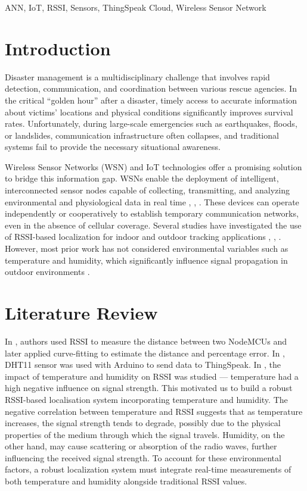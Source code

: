 \documentclass[conference]{IEEEtran}
\begin{document}
\begin{IEEEkeywords}
ANN, IoT, RSSI, Sensors, ThingSpeak Cloud, Wireless Sensor Network
\end{IEEEkeywords}
\section{Introduction}
Disaster management is a multidisciplinary challenge that involves rapid detection, communication, and coordination between various rescue agencies. In the critical “golden hour” after a disaster, timely access to accurate information about victims’ locations and physical conditions significantly improves survival rates. Unfortunately, during large-scale emergencies such as earthquakes, floods, or landslides, communication infrastructure often collapses, and traditional systems fail to provide the necessary situational awareness.

Wireless Sensor Networks (WSN) and IoT technologies offer a promising solution to bridge this information gap. WSNs enable the deployment of intelligent, interconnected sensor nodes capable of collecting, transmitting, and analyzing environmental and physiological data in real time \cite{b1}, \cite{b3}, \cite{b4}. These devices can operate independently or cooperatively to establish temporary communication networks, even in the absence of cellular coverage. Several studies have investigated the use of RSSI-based localization for indoor and outdoor tracking applications \cite{b1}, \cite{b2}, \cite{b6}. However, most prior work has not considered environmental variables such as temperature and humidity, which significantly influence signal propagation in outdoor environments \cite{b4}.


\section{Literature Review}
In \cite{b2}, authors used RSSI to measure the distance between two NodeMCUs and later applied curve-fitting to estimate the distance and percentage error. In \cite{b3}, DHT11 sensor was used with Arduino to send data to ThingSpeak. In \cite{b4}, the impact of temperature and humidity on RSSI was studied — temperature had a high negative influence on signal strength. This motivated us to build a robust RSSI-based localisation system incorporating temperature and humidity. The negative correlation between temperature and RSSI suggests that as temperature increases, the signal strength tends to degrade, possibly due to the physical properties of the medium through which the signal travels. Humidity, on the other hand, may cause scattering or absorption of the radio waves, further influencing the received signal strength. To account for these environmental factors, a robust localization system must integrate real-time measurements of both temperature and humidity alongside traditional RSSI values.
\end{document}
